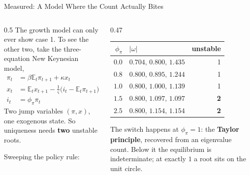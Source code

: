 \begin{frame}{Measured: A Model Where the Count Actually Bites}
\begin{columns}[T]
\begin{column}{0.5\textwidth}
\small
The growth model can only ever show case 1. To see the other two, take the three-equation New Keynesian model,
\begin{align*}
 \pi_t &= \beta\mathbb{E}_t\pi_{t+1}+\kappa x_t\\
 x_t &= \mathbb{E}_t x_{t+1}-\tfrac{1}{\varsigma}\big(i_t-\mathbb{E}_t\pi_{t+1}\big)\\
 i_t &= \phi_\pi \pi_t
\end{align*}
Two jump variables $(\pi,x)$, one exogenous state. So uniqueness needs \textbf{two} unstable roots.
\medskip

Sweeping the policy rule:
\end{column}
\begin{column}{0.47\textwidth}
\begin{center}\footnotesize
\begin{tabularx}{\linewidth}{@{}r >{\raggedright\arraybackslash}X r@{}}
\toprule
$\phi_\pi$ & $|\omega|$ & unstable \\
\midrule
$0.0$ & $0.704,\,0.800,\,1.435$ & 1 \\
$0.8$ & $0.800,\,0.895,\,1.244$ & 1 \\
$1.0$ & $0.800,\,1.000,\,1.139$ & 1 \\
$1.5$ & $0.800,\,1.097,\,1.097$ & \textbf{2} \\
$2.5$ & $0.800,\,1.154,\,1.154$ & \textbf{2} \\
\bottomrule
\end{tabularx}
\end{center}
\medskip
\begin{takeawaybox}\footnotesize
The switch happens at $\phi_\pi=1$: the \textbf{Taylor principle}, recovered from an eigenvalue count. Below it the equilibrium is indeterminate; at exactly $1$ a root sits on the unit circle.
\end{takeawaybox}
\end{column}
\end{columns}
\vspace{1mm}
\end{frame}


